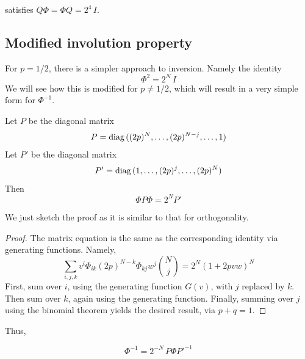 \documentclass[runningheads]{llncs}
\begin{document}
satisfies $Q\Phi=\Phi Q=2^4\,I$.

\subsection{Modified involution property}
For $p=1/2$, there is a simpler approach to inversion. Namely the identity
$$\Phi^2=2^N\,I$$
We will see how this is modified for $p\ne1/2$, which will result in a very simple form for $\Phi^{-1}$.

\begin{proposition}
Let $P$ be the diagonal matrix 
$$P=\mbox{\rm diag}\,((2p)^N,\ldots,(2p)^{N-j},\ldots,1)$$
Let $P'$ be the diagonal matrix
$$P'=\text{\rm diag}\,(1,\ldots,(2p)^j,\ldots,(2p)^N)$$
Then
$$\Phi P\Phi=2^NP'$$
\end{proposition}

We just sketch the proof as it is similar to that for orthogonality.

\begin{proof}
The matrix equation is the same as the corresponding identity via generating functions. Namely,
$$\sum_{i,j,k}v^i\Phi_{ik}(2p)^{N-k}\Phi_{kj}w^j\binom{N}{j}=2^N(1+2pvw)^N$$
First, sum over $i$, using the generating function $G(v)$, with $j$ replaced by $k$. Then sum over $k$, again using the generating 
function. Finally, summing over $j$ using the binomial theorem yields the desired result, via $p+q=1$.
\end{proof}

Thus,

\begin{corollary}
$$\Phi^{-1}=2^{-N}\,P\Phi P'^{-1}$$
\end{corollary}
\end{document}
